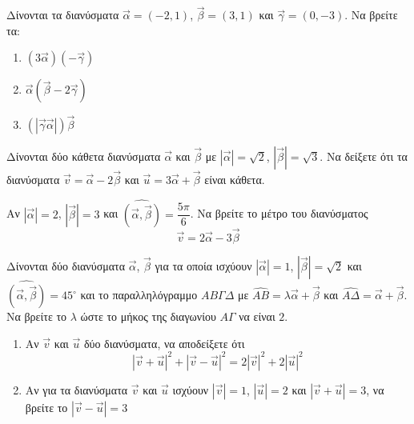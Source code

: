 \documentclass[greek]{beamer}
\begin{document}
\begin{askisi}
  Δίνονται τα διανύσματα $\vec{α}=(-2,1)$, $\vec{β}=(3,1)$ και $\vec{γ}=(0,-3)$. Να βρείτε τα:

  \begin{enumerate}
    \item<1-> $(3\vec{α})(-\vec{γ})$
    \item<2-> $\vec{α}(\vec{β}-2\vec{γ})$
    \item<3-> $(|\vec{γ}\vec{α}|)\vec{β}$
  \end{enumerate}


\end{askisi}

\begin{askisi}
  Δίνονται δύο κάθετα διανύσματα $\vec{α}$ και $\vec{β}$ με $|\vec{α}|=\sqrt{2}$, $|\vec{β}|=\sqrt{3}$. Να δείξετε ότι τα διανύσματα $\vec{v}=\vec{α}-2\vec{β}$ και $\vec{u}=3\vec{α}+\vec{β}$ είναι κάθετα.

\end{askisi}

\begin{askisi}
  Αν $|\vec{α}|=2$, $|\vec{β}|=3$ και $\widehat{(\vec{α }, \vec{β })}=\dfrac{5\pi}{6}$. Να βρείτε το μέτρο του διανύσματος
  $$\vec{v}=2\vec{α}-3\vec{β}$$

\end{askisi}

\begin{askisi}
  Δίνονται δύο διανύσματα $\vec{α}$, $\vec{β}$ για τα οποία ισχύουν $|\vec{α}|=1$, $|\vec{β}|=\sqrt{2}$ και $\widehat{(\vec{α }, \vec{β })}=45^{\circ}$ και το παραλληλόγραμμο $ΑΒΓΔ$ με $\widehat{ΑΒ}=λ\vec{α}+\vec{β}$ και $\widehat{ΑΔ}=\vec{α}+\vec{β}$. Να βρείτε το $λ$ ώστε το μήκος της διαγωνίου $ΑΓ$ να είναι $2$.

\end{askisi}

\begin{askisi}
  \begin{enumerate}
    \item<1-> Αν $\vec{v}$ και $\vec{u}$ δύο διανύσματα, να αποδείξετε ότι
          $$|\vec{v}+\vec{u}|^2+|\vec{v}-\vec{u}|^2=2|\vec{v}|^2+2|\vec{u}|^2$$
    \item<2-> Αν για τα διανύσματα $\vec{v}$ και $\vec{u}$ ισχύουν $|\vec{v}|=1$, $|\vec{u}|=2$ και $|\vec{v}+\vec{u}|=3$, να βρείτε το $|\vec{v}-\vec{u}|=3$
  \end{enumerate}

\end{askisi}
\end{document}
